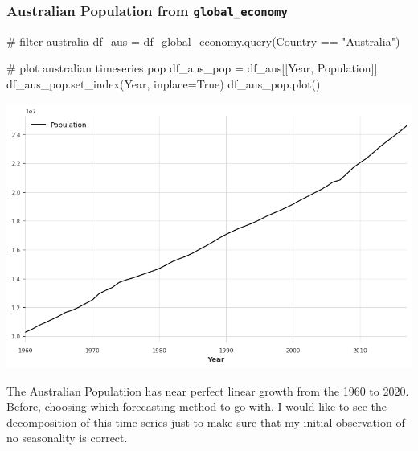 \documentclass[
  11pt,
]{article}
\newenvironment{Shaded}{\begin{snugshade}}{\end{snugshade}}
\newcommand{\CommentTok}[1]{\textcolor[rgb]{0.37,0.37,0.37}{#1}}
\newcommand{\NormalTok}[1]{\textcolor[rgb]{0.00,0.23,0.31}{#1}}
\newcommand{\OperatorTok}[1]{\textcolor[rgb]{0.37,0.37,0.37}{#1}}
\newcommand{\StringTok}[1]{\textcolor[rgb]{0.13,0.47,0.30}{#1}}
\newcommand{\VariableTok}[1]{\textcolor[rgb]{0.07,0.07,0.07}{#1}}
\begin{document}
\subsubsection{\texorpdfstring{Australian Population from
\texttt{global\_economy}}{Australian Population from global\_economy}}\label{australian-population-from-global_economy}

\begin{Shaded}
\begin{Highlighting}[]
\CommentTok{\# filter australia}
\NormalTok{df\_aus }\OperatorTok{=}\NormalTok{ df\_global\_economy.query(}\StringTok{\textquotesingle{}Country == "Australia"\textquotesingle{}}\NormalTok{)}
\end{Highlighting}
\end{Shaded}

\begin{Shaded}
\begin{Highlighting}[]
\CommentTok{\# plot australian timeseries pop}
\NormalTok{df\_aus\_pop }\OperatorTok{=}\NormalTok{ df\_aus[[}\StringTok{\textquotesingle{}Year\textquotesingle{}}\NormalTok{, }\StringTok{\textquotesingle{}Population\textquotesingle{}}\NormalTok{]]}
\NormalTok{df\_aus\_pop.set\_index(}\StringTok{\textquotesingle{}Year\textquotesingle{}}\NormalTok{, inplace}\OperatorTok{=}\VariableTok{True}\NormalTok{)}
\NormalTok{df\_aus\_pop.plot()}
\end{Highlighting}
\end{Shaded}

\includegraphics{hw3_files/figure-pdf/cell-6-output-1.png}

The Australian Populatiion has near perfect linear growth from the 1960
to 2020. Before, choosing which forecasting method to go with. I would
like to see the decomposition of this time series just to make sure that
my initial observation of no seasonality is correct.
\end{document}
